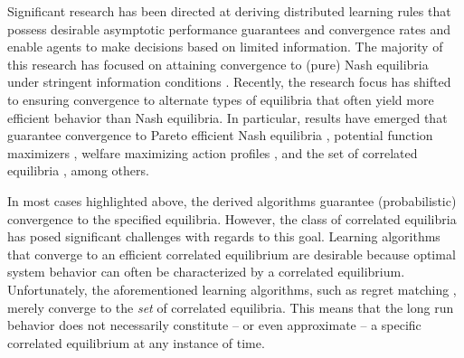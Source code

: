 Significant research has been directed at deriving distributed learning rules that possess desirable asymptotic performance guarantees and convergence rates and enable agents to make decisions based on limited information. The majority of this research has focused on attaining convergence to (pure) Nash equilibria under stringent information conditions \cite{Young2009, Frihauf2012, Foster2006, Boussaton2012, Poveda2013, Gharesifard2012}. Recently, the research focus has shifted to ensuring convergence to alternate types of equilibria that often yield more efficient behavior than Nash equilibria.  In particular, results have emerged that guarantee convergence to Pareto efficient Nash equilibria \cite{Marden2009,Pradelski2012}, potential function maximizers \cite{Blume1993, Marden2012}, welfare maximizing action profiles \cite{Marden2011, Arieli2012}, and the set of correlated equilibria \cite{Hart2000,Marden2013c,Aumann1987,Foster1997}, among others.  

In most cases highlighted above, the derived algorithms guarantee (probabilistic) convergence to the specified equilibria.  However, the class of correlated equilibria has posed significant challenges with regards to this goal. Learning algorithms that converge to an efficient correlated equilibrium are desirable because optimal system behavior can often be characterized by a correlated equilibrium. Unfortunately, the aforementioned learning algorithms, such as regret matching \cite{Hart2000}, merely converge to the \emph{set} of correlated equilibria. This means that the long run behavior does not necessarily constitute -- or even approximate -- a specific correlated equilibrium at any instance of time.







